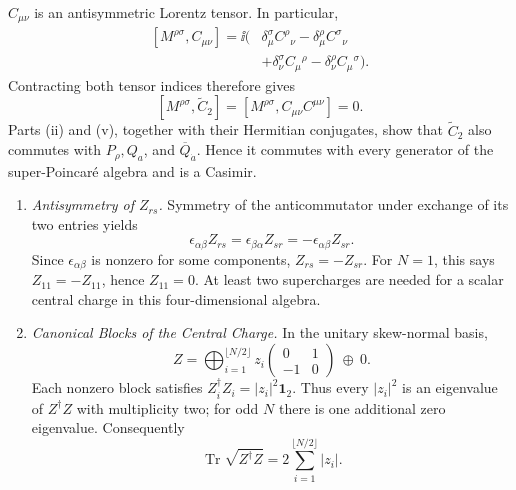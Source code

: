 \begin{enumerate}
\begin{enumerate}
      \(C_{\mu\nu}\) is an antisymmetric Lorentz tensor.  In particular,
      \[
      \begin{aligned}
        [M^{\rho\sigma},C_{\mu\nu}]
          =\ii\big(&\delta_\mu^\sigma C^\rho{}_\nu
                 -\delta_\mu^\rho C^\sigma{}_\nu\\
                &+\delta_\nu^\sigma C_\mu{}^\rho
                 -\delta_\nu^\rho C_\mu{}^\sigma\big).
      \end{aligned}
      \]
      Contracting both tensor indices therefore gives
      \[
        [M^{\rho\sigma},\widetilde C_2]
          =[M^{\rho\sigma},C_{\mu\nu}C^{\mu\nu}]=0.
      \]
      Parts (ii) and (v), together with their Hermitian conjugates, show
      that \(\widetilde C_2\) also commutes with \(P_\rho,Q_a\), and
      \(\overline Q_{\dot a}\).  Hence it commutes with every generator
      of the super-Poincar\'e algebra and is a Casimir.
  \end{enumerate}

  \begin{enumerate}
    \item \emph{Antisymmetry of \(Z_{rs}\).}
    Symmetry of the anticommutator under exchange of its two entries yields
      \[
        \epsilon_{\alpha\beta}Z_{rs}
          =\epsilon_{\beta\alpha}Z_{sr}
          =-\epsilon_{\alpha\beta}Z_{sr}.
      \]
      Since \(\epsilon_{\alpha\beta}\) is nonzero for some components,
      \(Z_{rs}=-Z_{sr}\).  For \(N=1\), this says \(Z_{11}=-Z_{11}\), hence
      \(Z_{11}=0\).  At least two supercharges are needed for a scalar central
      charge in this four-dimensional algebra.
    \item \emph{Canonical Blocks of the Central Charge.}
    In the unitary skew-normal basis,
      \[
        Z=\bigoplus_{i=1}^{\lfloor N/2\rfloor}
           z_i\begin{pmatrix}0&1\\-1&0\end{pmatrix}
           \ \oplus\ 0 .
      \]
      Each nonzero block satisfies
      \(Z_i^\dagger Z_i=|z_i|^2\mathbf1_2\).  Thus every
      \(|z_i|^2\) is an eigenvalue of \(Z^\dagger Z\) with multiplicity two;
      for odd \(N\) there is one additional zero eigenvalue.  Consequently
      \[
        \operatorname{Tr}\sqrt{Z^\dagger Z}
          =2\sum_{i=1}^{\lfloor N/2\rfloor}|z_i|.
      \]
  \end{enumerate}


\end{enumerate}
